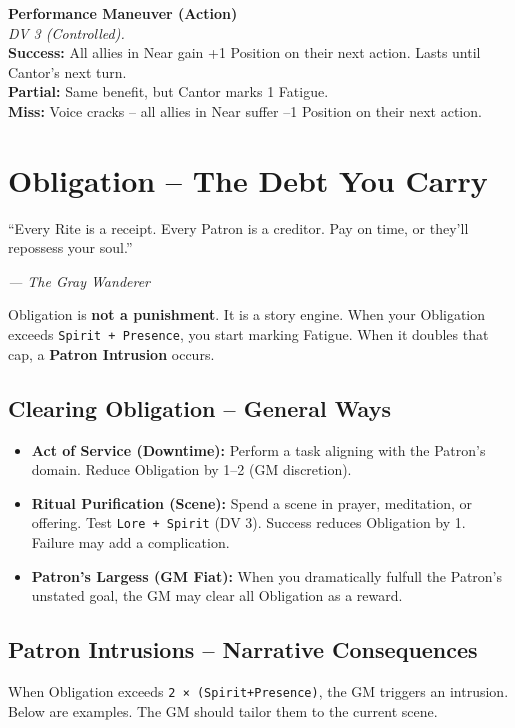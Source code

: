 \documentclass[10pt,a5paper]{book}
\begin{document}
\begin{tcolorbox}[colback=green!5, colframe=green!50]
\textbf{Performance Maneuver (Action)} \\
\textit{DV 3 (Controlled).} \\
\textbf{Success:} All allies in Near gain +1 Position on their next action. Lasts until Cantor’s next turn. \\
\textbf{Partial:} Same benefit, but Cantor marks 1 Fatigue. \\
\textbf{Miss:} Voice cracks – all allies in Near suffer –1 Position on their next action.
\end{tcolorbox}

\clearpage

\chapter{Obligation – The Debt You Carry}
\epigraph{“Every Rite is a receipt. Every Patron is a creditor. Pay on time, or they’ll repossess your soul.”}{\textit{— The Gray Wanderer}}

Obligation is \textbf{not a punishment}. It is a story engine. When your Obligation exceeds \texttt{Spirit + Presence}, you start marking Fatigue. When it doubles that cap, a \textbf{Patron Intrusion} occurs.

\section{Clearing Obligation – General Ways}
\begin{itemize}
    \item \textbf{Act of Service (Downtime):} Perform a task aligning with the Patron’s domain. Reduce Obligation by 1–2 (GM discretion).
    \item \textbf{Ritual Purification (Scene):} Spend a scene in prayer, meditation, or offering. Test \texttt{Lore + Spirit} (DV 3). Success reduces Obligation by 1. Failure may add a complication.
    \item \textbf{Patron’s Largess (GM Fiat):} When you dramatically fulfull the Patron’s unstated goal, the GM may clear all Obligation as a reward.
\end{itemize}

\section*{Patron Intrusions – Narrative Consequences}
When Obligation exceeds \texttt{2 × (Spirit+Presence)}, the GM triggers an intrusion. Below are examples. The GM should tailor them to the current scene.
\end{document}
